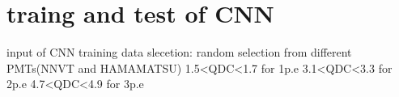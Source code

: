 \documentclass[11pt,compress,xcolor=x11names,UTF8]{beamer}
\begin{document}
\section{traing and test of CNN}
\begin{frame}{input of CNN}
training data slecetion:
random selection from different PMTs(NNVT and HAMAMATSU) 
1.5<QDC<1.7 for 1p.e
3.1<QDC<3.3 for 2p.e
4.7<QDC<4.9 for 3p.e
\end{frame}
\end{document}
